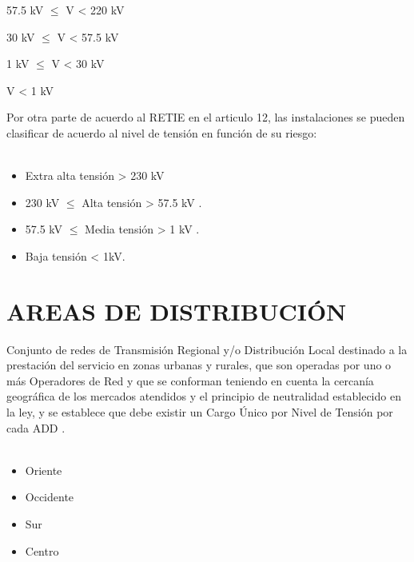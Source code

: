 \documentclass[a5paper]{book}%
\begin{document}
\begin{center}

  \begin{tcolorbox}[ title=SDL:Nivel de tensión 4]
    {57.5 kV $\leq$ V < 220 kV }
\end{tcolorbox}

  \begin{tcolorbox}[ title=SDL:Nivel de tensión 3]
    {30 kV $\leq$ V < 57.5 kV }
\end{tcolorbox}
\begin{tcolorbox}[ title=SDL:Nivel de tensión 2]
  { 1 kV $\leq$ V < 30 kV }
  \end{tcolorbox}
\begin{tcolorbox}[ title=SDL:Nivel de tensión 1]
  { V < 1 kV }
  \end{tcolorbox}
\end{center}

Por otra parte de acuerdo  al \ac{RETIE} \cite{RETIE2013} en el articulo 12, las instalaciones se pueden clasificar de acuerdo al nivel de tensión en función de su riesgo:\\\\
\begin{itemize}
\item Extra alta tensión > 230 kV
\item  230 kV  $\leqslant$ Alta tensión  > 57.5 kV .
\item 57.5 kV  $\leqslant$ Media tensión  > 1 kV .
\item Baja tensión < 1kV.
  \end{itemize}


\section{AREAS DE DISTRIBUCIÓN}
Conjunto de redes de Transmisión Regional y/o Distribución Local
destinado a la prestación del servicio en zonas urbanas y rurales, que
son operadas por uno o más Operadores de Red y que se conforman
teniendo en cuenta la cercanía geográfica de los mercados atendidos y
el principio de neutralidad establecido en la ley, y se establece que
debe existir un Cargo Único por Nivel de Tensión por cada ADD \cite{CREG1332013}.\\\\
\begin{itemize}
\item Oriente
\item  Occidente
\item  Sur 
                            \item  Centro
\end{itemize}
\end{document}
